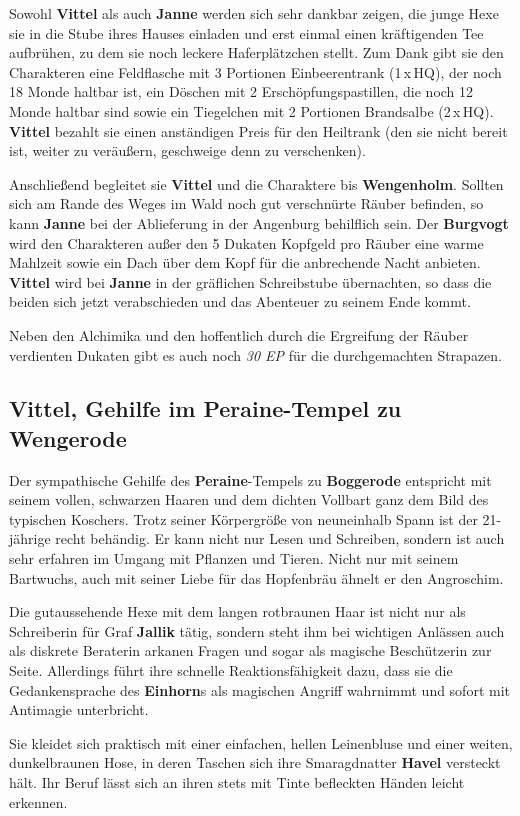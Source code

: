 Sowohl \textbf{Vittel} als auch \textbf{Janne} werden sich sehr dankbar zeigen, die junge Hexe sie in die Stube ihres Hauses einladen und erst einmal einen kräftigenden Tee aufbrühen, zu dem sie noch leckere Haferplätzchen stellt.
Zum Dank gibt sie den Charakteren eine Feldflasche mit 3 Portionen Einbeerentrank (1\,x\,HQ), der noch 18 Monde haltbar ist, ein Döschen mit 2 Erschöpfungspastillen, die noch 12 Monde haltbar sind sowie ein Tiegelchen mit 2 Portionen Brandsalbe (2\,x\,HQ).
\textbf{Vittel} bezahlt sie einen anständigen Preis für den Heiltrank (den sie nicht bereit ist, weiter zu veräußern, geschweige denn zu verschenken).


Anschließend begleitet sie \textbf{Vittel} und die Charaktere bis \textbf{Wengenholm}.
Sollten sich am Rande des Weges im Wald noch gut verschnürte Räuber befinden, so kann \textbf{Janne} bei der Ablieferung in der Angenburg behilflich sein.
Der \textbf{Burgvogt} wird den Charakteren außer den 5 Dukaten Kopfgeld pro Räuber eine warme Mahlzeit sowie ein Dach über dem Kopf für die anbrechende Nacht anbieten.
\textbf{Vittel} wird bei \textbf{Janne} in der gräflichen Schreibstube übernachten, so dass die beiden sich jetzt verabschieden und das Abenteuer zu seinem Ende kommt. 

Neben den Alchimika und den hoffentlich durch die Ergreifung der Räuber verdienten Dukaten gibt es auch noch \textit{30 EP} für die durchgemachten Strapazen.


 




\subsection[Vittel, Gehilfe im Peraine-Tempel]{Vittel, Gehilfe im Peraine-Tempel zu Wengerode}
Der sympathische Gehilfe des \textbf{Peraine}-Tempels zu \textbf{Boggerode} entspricht mit seinem vollen, schwarzen Haaren und dem dichten Vollbart ganz dem Bild des typischen Koschers.
Trotz seiner Körpergröße von neuneinhalb Spann ist der 21-jährige recht behändig.
Er kann nicht nur Lesen und Schreiben, sondern ist auch sehr erfahren im Umgang mit Pflanzen und Tieren.
Nicht nur mit seinem Bartwuchs, auch mit seiner Liebe für das Hopfenbräu ähnelt er den Angroschim.


Die gutaussehende Hexe mit dem langen rotbraunen Haar ist nicht nur als Schreiberin für Graf \textbf{Jallik} tätig, sondern steht ihm bei wichtigen Anlässen auch als diskrete Beraterin arkanen Fragen und sogar als magische Beschützerin zur Seite. Allerdings führt ihre schnelle Reaktionsfähigkeit dazu, dass sie die Gedankensprache des \textbf{Einhorn}s als magischen Angriff wahrnimmt und sofort mit Antimagie unterbricht.

Sie kleidet sich praktisch mit einer einfachen, hellen Leinenbluse und einer weiten, dunkelbraunen Hose, in deren Taschen sich ihre Smaragdnatter \textbf{Havel} versteckt hält. Ihr Beruf lässt sich an ihren stets mit Tinte befleckten Händen leicht erkennen.

\spaltenende